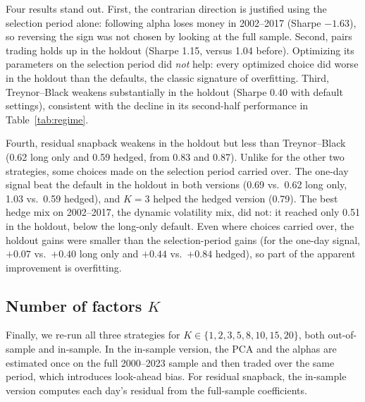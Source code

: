 \documentclass[11pt,letterpaper]{article}
\begin{document}
Four results stand out. First, the contrarian direction is justified using the selection period
alone: following alpha loses money in 2002--2017 (Sharpe $-1.63$), so reversing the sign was not
chosen by looking at the full sample. Second, pairs trading holds up in the holdout (Sharpe
1.15, versus 1.04 before). Optimizing its parameters on the selection period did \emph{not}
help: every optimized choice did worse in the holdout than the defaults, the classic signature
of overfitting. Third, Treynor--Black weakens substantially in the holdout (Sharpe 0.40 with
default settings), consistent with the decline in its second-half performance in
Table~\ref{tab:regime}.

Fourth, residual snapback weakens in the holdout but less than Treynor--Black (0.62 long only
and 0.59 hedged, from 0.83 and 0.87). Unlike for the other two strategies, some choices made on
the selection period carried over. The one-day signal beat the default in the holdout in both
versions (0.69 vs.\ 0.62 long only, 1.03 vs.\ 0.59 hedged), and $K
= 3$ helped the hedged version (0.79). The best hedge mix on 2002--2017, the dynamic volatility
mix, did not: it reached only 0.51 in the holdout, below the long-only default. Even where
choices carried over, the holdout gains were smaller than the selection-period gains (for the
one-day signal, $+0.07$ vs.\ $+0.40$ long only and $+0.44$
vs.\ $+0.84$ hedged), so part of the apparent improvement is overfitting.

\subsection{Number of factors $K$}

Finally, we re-run all three strategies for $K \in \{1, 2, 3, 5, 8, 10, 15, 20\}$, both
out-of-sample and in-sample. In the in-sample version, the PCA and the alphas are estimated once
on the full 2000--2023 sample and then traded over the same period, which introduces look-ahead
bias. For residual snapback, the in-sample version computes each day's residual from the
full-sample coefficients.
\end{document}
